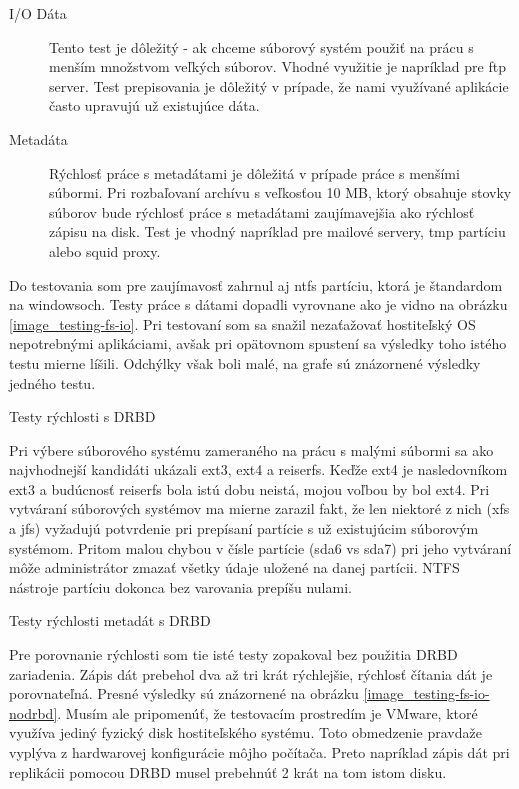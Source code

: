 \begin{description}
	\item[I/O Dáta] Tento test je dôležitý - ak chceme súborový systém použiť na prácu s menším množstvom veľkých súborov. Vhodné využitie je napríklad pre ftp server. Test prepisovania je dôležitý v prípade, že nami využívané aplikácie často upravujú už existujúce dáta.
	\item[Metadáta] Rýchlosť práce s metadátami je dôležitá v prípade práce s menšími súbormi. Pri rozbaľovaní archívu s veľkosťou 10 MB, ktorý obsahuje stovky súborov bude rýchlosť práce s metadátami zaujímavejšia ako rýchlosť zápisu na disk. Test je vhodný napríklad pre mailové servery, tmp partíciu alebo squid proxy.
\end{description}

Do testovania som pre zaujímavosť zahrnul aj ntfs partíciu, ktorá je štandardom na windowsoch. Testy práce s dátami dopadli vyrovnane ako je vidno na obrázku \ref{image_testing-fs-io}. Pri testovaní som sa snažil nezaťažovať hostiteľský OS nepotrebnými aplikáciami, avšak pri opätovnom spustení sa výsledky toho istého testu mierne líšili. Odchýlky však boli malé, na grafe sú znázornené výsledky jedného testu.

 {Testy rýchlosti s DRBD}

Pri výbere súborového systému zameraného na prácu s malými súbormi sa ako najvhodnejší kandidáti ukázali ext3, ext4 a reiserfs. Keďže ext4 je nasledovníkom ext3 a budúcnosť reiserfs bola istú dobu neistá, mojou voľbou by bol ext4. Pri vytváraní súborových systémov ma mierne zarazil fakt, že len niektoré z nich (xfs a jfs) vyžadujú potvrdenie pri prepísaní partície s už existujúcim súborovým systémom. Pritom malou chybou v čísle partície (sda6 vs sda7) pri jeho vytváraní môže administrátor zmazať všetky údaje uložené na danej partícii. NTFS nástroje partíciu dokonca bez varovania prepíšu nulami.

 {Testy rýchlosti metadát s DRBD}

Pre porovnanie rýchlosti som tie isté testy zopakoval bez použitia DRBD zariadenia. Zápis dát prebehol dva až tri krát rýchlejšie, rýchlosť čítania dát je porovnateľná. Presné výsledky sú znázornené na obrázku \ref{image_testing-fs-io-nodrbd}. Musím ale pripomenúť, že testovacím prostredím je VMware, ktoré využíva jediný fyzický disk hostiteľského systému. Toto obmedzenie pravdaže vyplýva z hardwarovej konfigurácie môjho počítača. Preto napríklad zápis dát pri replikácii pomocou DRBD musel prebehnúť 2 krát na tom istom disku.

